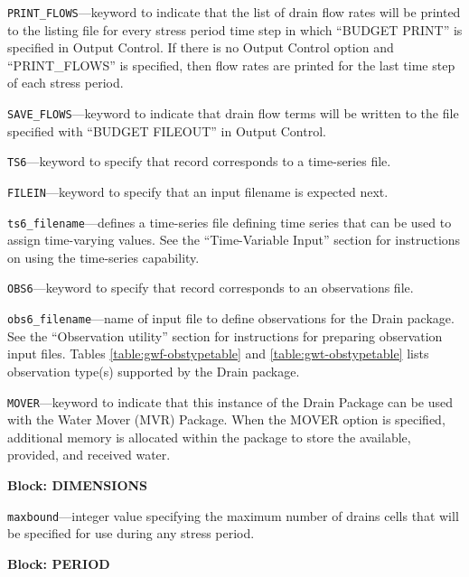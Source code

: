 \begin{description}
\item \texttt{PRINT\_FLOWS}---keyword to indicate that the list of drain flow rates will be printed to the listing file for every stress period time step in which ``BUDGET PRINT'' is specified in Output Control.  If there is no Output Control option and ``PRINT\_FLOWS'' is specified, then flow rates are printed for the last time step of each stress period.

\item \texttt{SAVE\_FLOWS}---keyword to indicate that drain flow terms will be written to the file specified with ``BUDGET FILEOUT'' in Output Control.

\item \texttt{TS6}---keyword to specify that record corresponds to a time-series file.

\item \texttt{FILEIN}---keyword to specify that an input filename is expected next.

\item \texttt{ts6\_filename}---defines a time-series file defining time series that can be used to assign time-varying values. See the ``Time-Variable Input'' section for instructions on using the time-series capability.

\item \texttt{OBS6}---keyword to specify that record corresponds to an observations file.

\item \texttt{obs6\_filename}---name of input file to define observations for the Drain package. See the ``Observation utility'' section for instructions for preparing observation input files. Tables \ref{table:gwf-obstypetable} and \ref{table:gwt-obstypetable} lists observation type(s) supported by the Drain package.

\item \texttt{MOVER}---keyword to indicate that this instance of the Drain Package can be used with the Water Mover (MVR) Package.  When the MOVER option is specified, additional memory is allocated within the package to store the available, provided, and received water.

\end{description}
\item \textbf{Block: DIMENSIONS}

\begin{description}
\item \texttt{maxbound}---integer value specifying the maximum number of drains cells that will be specified for use during any stress period.

\end{description}
\item \textbf{Block: PERIOD}

